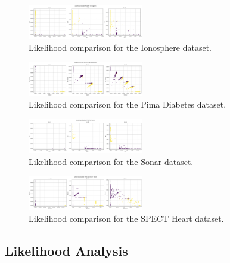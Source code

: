 \documentclass[conference]{IEEEtran}
\begin{document}
\begin{figure}[H]
    \centering
    \includegraphics[width=0.45\textwidth]{../scripts/comparison_results/Ionosphere_likelihood.png}
    \caption{Likelihood comparison for the Ionosphere dataset.}
    \label{fig:ionosphere_likelihood}
\end{figure}

\begin{figure}[H]
    \centering
    \includegraphics[width=0.45\textwidth]{../scripts/comparison_results/Pima Diabetes_likelihood.png}
    \caption{Likelihood comparison for the Pima Diabetes dataset.}
    \label{fig:pima_diabetes_likelihood}
\end{figure}

\begin{figure}[H]
    \centering
    \includegraphics[width=0.45\textwidth]{../scripts/comparison_results/Sonar_likelihood.png}
    \caption{Likelihood comparison for the Sonar dataset.}
    \label{fig:sonar_likelihood}
\end{figure}

\begin{figure}[H]
    \centering
    \includegraphics[width=0.45\textwidth]{../scripts/comparison_results/SPECT Heart_likelihood.png}
    \caption{Likelihood comparison for the SPECT Heart dataset.}
    \label{fig:spect_heart_likelihood}
\end{figure}

\subsection{Likelihood Analysis}
\end{document}
